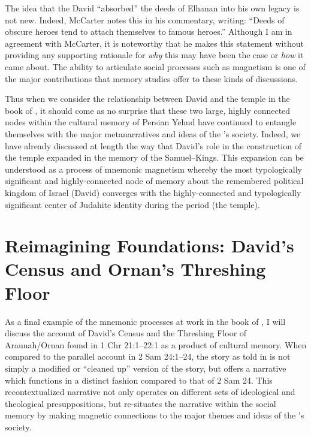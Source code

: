 The idea that the David ``absorbed'' the deeds of Elhanan into his own legacy is not new. Indeed, McCarter notes this in his commentary, writing: ``Deeds of obscure heroes tend to attach themselves to famous heroes.''\autocite[450]{mccarter1984} Although I am in agreement with McCarter, it is noteworthy that he makes this statement without providing any supporting rationale for \emph{why} this may have been the case or \emph{how} it came about. The ability to articulate social processes such as magnetism is one of the major contributions that memory studies offer to these kinds of discussions.

Thus when we consider the relationship between David and the temple in the book of \chronicles, it should come as no surprise that these two large, highly connected nodes within the cultural memory of Persian Yehud have continued to entangle themselves with the major metanarratives and ideas of the \chronicler's society. Indeed, we have already discussed at length the way that David's role in the construction of the temple expanded in the memory of the \chronicler \visavis Samuel--Kings. This expansion can be understood as a process of mnemonic magnetism whereby the most typologically significant and highly-connected node of memory about the remembered political kingdom of Israel (David) converges with the highly-connected and typologically significant center of Judahite identity during the \secondtemple period (the temple). 

\section{Reimagining Foundations: David's Census and Ornan's Threshing Floor}

As a final example of the mnemonic processes at work in the book of \chronicles, I will discuss the account of David's Census and the Threshing Floor of Araunah/Ornan found in 1 Chr 21:1--22:1 as a product of cultural memory. When compared to the parallel account in 2 Sam 24:1--24, the story as told in \chronicles is not simply a modified or ``cleaned up'' version of the story, but offers a narrative which functions in a distinct fashion compared to that of 2 Sam 24. This recontextualized narrative not only operates on different sets of ideological and theological presuppositions, but re-situates the narrative within the social memory by making magnetic connections to the major themes and ideas of the \chronicler's society.

